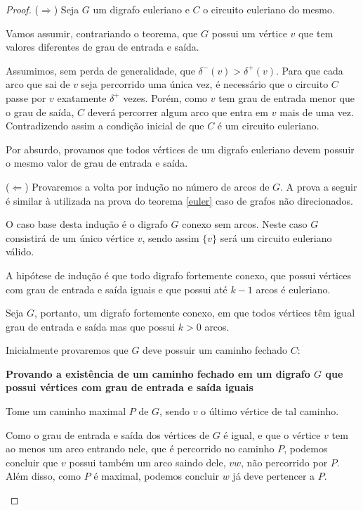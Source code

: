 \documentclass[12pt, a4paper]{article}
\begin{document}
\begin{proof}

    ($\Rightarrow$) Seja $G$ um digrafo euleriano e $C$ o circuito euleriano do mesmo. 

    Vamos assumir, contrariando o teorema, que $G$ possui um vértice $v$ que tem valores diferentes de grau de entrada e saída.

    Assumimos, sem perda de generalidade, que $\delta^-(v) > \delta^+(v)$. 
    Para que cada arco que sai de $v$ seja percorrido uma única vez, é necessário que o circuito $C$ passe por $v$ exatamente $\delta^+$ vezes. 
    Porém, como $v$ tem grau de entrada menor que o grau de saída, $C$ deverá percorrer algum arco que entra em $v$ mais de uma vez. 
    Contradizendo assim a condição inicial de que $C$ é um circuito euleriano.

    Por absurdo, provamos que todos vértices de um digrafo euleriano devem possuir o mesmo valor de grau de entrada e saída.

    ($\Leftarrow$) Provaremos a volta por indução no número de arcos de $G$. 
    A prova a seguir é similar à utilizada na prova do teorema \ref{euler} caso de grafos não direcionados.

    O caso base desta indução é o digrafo $G$ conexo sem arcos. Neste caso $G$ consistirá de um único vértice $v$, sendo assim $\{v\}$ será um circuito euleriano válido. 

    A hipótese de indução é que todo digrafo fortemente conexo, que possui vértices com grau de entrada e saída iguais e que possui até $k-1$ arcos é euleriano.

    Seja $G$, portanto, um digrafo fortemente conexo, em que todos vértices têm igual grau de entrada e saída mas que possui $k > 0$ arcos.

    Inicialmente provaremos que $G$ deve possuir um caminho fechado $C$:

    \begin{tcolorbox}
        \textbf{Provando a existência de um caminho fechado em um digrafo $G$ que possui vértices com grau de entrada e saída iguais}

        Tome um caminho maximal $P$ de $G$, sendo $v$ o último vértice de tal caminho.

        Como o grau de entrada e saída dos vértices de $G$ é igual, e que o vértice $v$ tem ao menos um arco entrando nele, que é percorrido no caminho $P$, podemos concluir que $v$ possui também um arco saindo dele, $vw$, não percorrido por $P$.
        Além disso, como $P$ é maximal, podemos concluir $w$ já deve pertencer a $P$.


\end{tcolorbox}
\end{proof}
\end{document}
